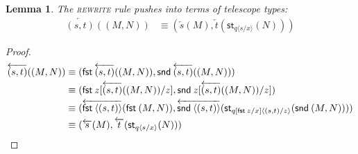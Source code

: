 \documentclass[10pt]{article}
\newtheorem{lemma}{Lemma}
\theoremstyle{definition}
\newcommand\dsd[1]{\ensuremath{\mathsf{#1}}}
\newcommand{\rewrite}[2]{\overleftarrow{#1}(#2)}
\newcommand\StI[2]{\ensuremath{\mathsf{st}_{#1}(#2)}}
\newcommand\UnSt[2]{\ensuremath{\mathsf{unst}_{#1}(#2)}}
\newcommand{\id}{\mathsf{id}}
\newcommand\ap[2]{\ensuremath{#1 \langle #2 \rangle }}
\newcommand{\app}[2]{\ensuremath{#1 \: #2}}
\newcommand{\fst}[1]{\app{\dsd{fst}}{#1}}
\newcommand{\snd}[1]{\app{\dsd{snd}}{#1}}
\begin{document}
\begin{lemma}
The \textsc{rewrite} rule pushes into terms of telescope types:
\begin{align*}
\rewrite{(s, t)}{(M, N)} &\equiv (\rewrite{s}{M}, \rewrite{t}{\StI{\ap{q}{s/x}}{N}} ) 
\end{align*}
\end{lemma}
\begin{proof}
\begin{align*}
\rewrite{(s, t)}{(M, N)} 
&\equiv (\fst\rewrite{(s, t)}{(M, N)}, \snd \rewrite{(s, t)}{(M, N)} ) \\
&\equiv (\fst z [\rewrite{(s, t)}{(M, N)}/z], \snd z [\rewrite{(s, t)}{(M, N)}/z] ) \\
&\equiv (\rewrite{\ap{\fst}{(s, t)}}{\fst (M, N)}, \rewrite{\ap{\snd}{(s, t)}}{\StI{\ap{q[\fst z/x]}{(s, t)/z}}{\snd (M, N)}} ) \\
&\equiv (\rewrite{s}{M}, \rewrite{t}{\StI{\ap{q}{s/x}}{N}} )
\end{align*}


\end{proof}
\end{document}
